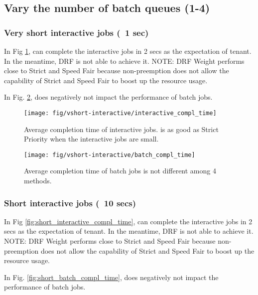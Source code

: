 \subsection{Vary the number of batch queues (1-4)}

\subsubsection{Very short interactive jobs (~1 sec)}

In Fig \ref{fig:vshort_interactive_compl_time}, \name can complete the interactive jobs in 2 secs as the expectation of tenant. In the meantime, DRF is not able to achieve it. NOTE: DRF Weight performs close to Strict and Speed Fair because non-preemption does not allow the capability of Strict and Speed Fair to boost up the resource usage.

In Fig. \ref{fig:vshort_batch_compl_time}, \name does negatively not impact the performance of batch jobs.

\begin{figure}
	\centering
	\texttt{[image: fig/vshort-interactive/interactive\_compl\_time]}
	\caption{Average completion time of interactive jobs. \name is as good as Strict Priority when the interactive jobs are small. }
	\label{fig:vshort_interactive_compl_time}
\end{figure}

\begin{figure}
	\centering
	\texttt{[image: fig/vshort-interactive/batch\_compl\_time]}
	\caption{Average completion time of batch jobs is not different among 4 methods.}
	\label{fig:vshort_batch_compl_time}
\end{figure}

\subsubsection{Short interactive jobs (~10 secs)}

In Fig \ref{fig:short_interactive_compl_time}, \name can complete the interactive jobs in 2 secs as the expectation of tenant. In the meantime, DRF is not able to achieve it. NOTE: DRF Weight performs close to Strict and Speed Fair because non-preemption does not allow the capability of Strict and Speed Fair to boost up the resource usage.

In Fig. \ref{fig:short_batch_compl_time}, \name does negatively not impact the performance of batch jobs.

